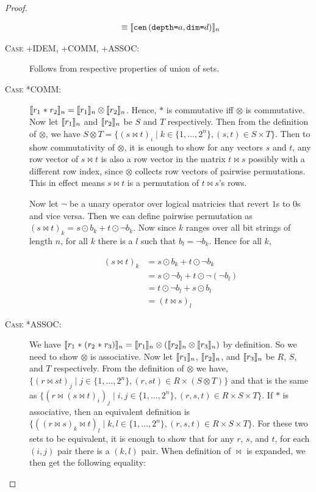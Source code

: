 \begin{proof}
\begin{description}
\begin{align*}
      \equiv & \; \llbracket{\texttt{cen} \, (\texttt{depth=}a, \texttt{dim=}d)}\rrbracket_n \\
    \end{align*}
  \item[\textsc{Case +IDEM, +COMM, +ASSOC}:]
    Follows from respective properties of union of sets.
  \item[\textsc{Case *COMM}:] $\llbracket{r_1 \; \texttt{$\ast$} \; r_2}\rrbracket_n =
    \llbracket{r_1}\rrbracket_n \otimes \llbracket{r_2}\rrbracket_n$. Hence, $\texttt{$\ast$}$ is
    commutative iff $\otimes$ is commutative. Now let $\llbracket{r_1}\rrbracket_n$ and
    $\llbracket{r_2}\rrbracket_n$ be $S$ and $T$ respectively. Then from the definition of
    $\otimes$, we have $S \otimes T = \{ (s \bowtie t)_i \mid k \in
    \{ 1, \ldots, 2^n \}, (s,t) \in S \times T \}$. Then to show
    commutativity of $\otimes$, it is enough to show for any vectors $s$ and
    $t$, any row vector of $s \bowtie t$ is also a row vector in the matrix
    $t \bowtie s$ possibly with a different row index, since $\otimes$ collects
    row vectors of pairwise permutations. This in effect means $s \bowtie t$
    is a permutation of $t \bowtie s$'s rows.

    Now let $\neg$ be a unary operator over logical matricies that revert $1$s
    to $0$s and vice versa. Then we can define pairwise permutation as
    $(s \bowtie t)_k = s \odot b_k + t \odot \neg b_k$. Now since $k$ ranges
    over all bit strings of length $n$, for all $k$ there is a $l$ such that
    $b_l = \neg b_k$. Hence for all $k$,

    \begin{align*}
      (s \bowtie t)_k &= s \odot b_k + t \odot \neg b_k \\
                      &= s \odot \neg b_l + t \odot \neg (\neg b_l) \\
                      &= t \odot \neg b_l + s \odot b_l \\
                      &= (t \bowtie s)_l
    \end{align*}

  \item[\textsc{Case *ASSOC}:] We have $\llbracket{r_1 \; \texttt{$\ast$} \;
    (r_2 \; \texttt{$\ast$} \; r_3)}\rrbracket_n = \llbracket{r_1}\rrbracket_n \otimes (\llbracket{r_2}\rrbracket_n
    \otimes \llbracket{r_3}\rrbracket_n)$ by definition. So we need to show $\otimes$ is
    associative. Now let $\llbracket{r_1}\rrbracket_n$, $\llbracket{r_2}\rrbracket_n$, and
    $\llbracket{r_3}\rrbracket_n$ be $R$, $S$, and $T$ respectively. From the definition of
    $\otimes$ we have, $\{ (r \bowtie st)_j \mid j \in \{ 1, \ldots, 2^n\},
    (r, st) \in R \times (S \otimes T) \}$ and that is the same as
    $\{ (r \bowtie (s \bowtie t)_i)_j \mid i,j \in \{ 1, \ldots, 2^n \}, (r,s,t)
    \in R \times S \times T \}$. If $\ast$ is associative, then an equivalent
    definition is $\{ ((r \bowtie s)_k \bowtie t)_l \mid k,l \in \{ 1, \ldots,
    2^n \}, (r,s,t) \in R \times S \times T \}$. For these two sets to be
    equivalent, it is enough to show that for any $r$, $s$, and $t$, for each
    $(i,j)$ pair there is a $(k,l)$ pair. When definition of $\bowtie$ is
    expanded, we then get the following equality:


\end{description}
\end{proof}
